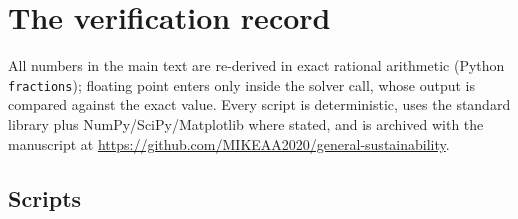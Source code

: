 \section{The verification record}\label{S:verification}

All numbers in the main text are re-derived in exact rational arithmetic (Python \texttt{fractions}); floating point enters only inside the solver call, whose output is compared against the exact value. Every script is deterministic, uses the standard library plus NumPy/SciPy/Matplotlib where stated, and is archived with the manuscript at \url{https://github.com/MIKEAA2020/general-sustainability}.

\subsection{Scripts}

